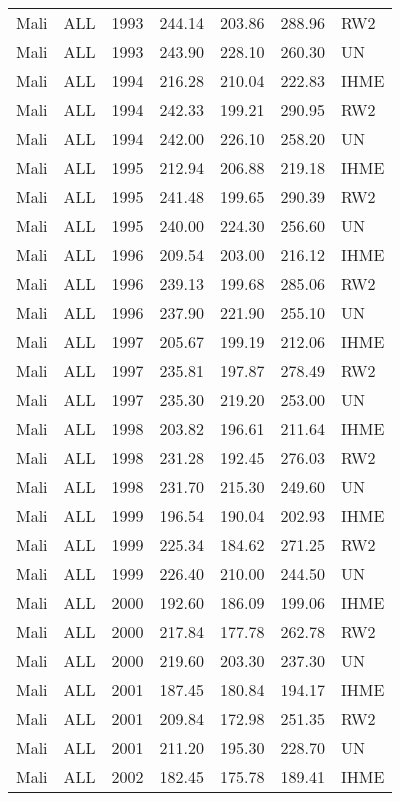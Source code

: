 \begin{longtable}{lllrrrl}
  Mali & ALL & 1993 & 244.14 & 203.86 & 288.96 & RW2 \\ 
  Mali & ALL & 1993 & 243.90 & 228.10 & 260.30 & UN \\ 
  Mali & ALL & 1994 & 216.28 & 210.04 & 222.83 & IHME \\ 
  Mali & ALL & 1994 & 242.33 & 199.21 & 290.95 & RW2 \\ 
  Mali & ALL & 1994 & 242.00 & 226.10 & 258.20 & UN \\ 
  Mali & ALL & 1995 & 212.94 & 206.88 & 219.18 & IHME \\ 
  Mali & ALL & 1995 & 241.48 & 199.65 & 290.39 & RW2 \\ 
  Mali & ALL & 1995 & 240.00 & 224.30 & 256.60 & UN \\ 
  Mali & ALL & 1996 & 209.54 & 203.00 & 216.12 & IHME \\ 
  Mali & ALL & 1996 & 239.13 & 199.68 & 285.06 & RW2 \\ 
  Mali & ALL & 1996 & 237.90 & 221.90 & 255.10 & UN \\ 
  Mali & ALL & 1997 & 205.67 & 199.19 & 212.06 & IHME \\ 
  Mali & ALL & 1997 & 235.81 & 197.87 & 278.49 & RW2 \\ 
  Mali & ALL & 1997 & 235.30 & 219.20 & 253.00 & UN \\ 
  Mali & ALL & 1998 & 203.82 & 196.61 & 211.64 & IHME \\ 
  Mali & ALL & 1998 & 231.28 & 192.45 & 276.03 & RW2 \\ 
  Mali & ALL & 1998 & 231.70 & 215.30 & 249.60 & UN \\ 
  Mali & ALL & 1999 & 196.54 & 190.04 & 202.93 & IHME \\ 
  Mali & ALL & 1999 & 225.34 & 184.62 & 271.25 & RW2 \\ 
  Mali & ALL & 1999 & 226.40 & 210.00 & 244.50 & UN \\ 
  Mali & ALL & 2000 & 192.60 & 186.09 & 199.06 & IHME \\ 
  Mali & ALL & 2000 & 217.84 & 177.78 & 262.78 & RW2 \\ 
  Mali & ALL & 2000 & 219.60 & 203.30 & 237.30 & UN \\ 
  Mali & ALL & 2001 & 187.45 & 180.84 & 194.17 & IHME \\ 
  Mali & ALL & 2001 & 209.84 & 172.98 & 251.35 & RW2 \\ 
  Mali & ALL & 2001 & 211.20 & 195.30 & 228.70 & UN \\ 
  Mali & ALL & 2002 & 182.45 & 175.78 & 189.41 & IHME \\ 

\end{longtable}
